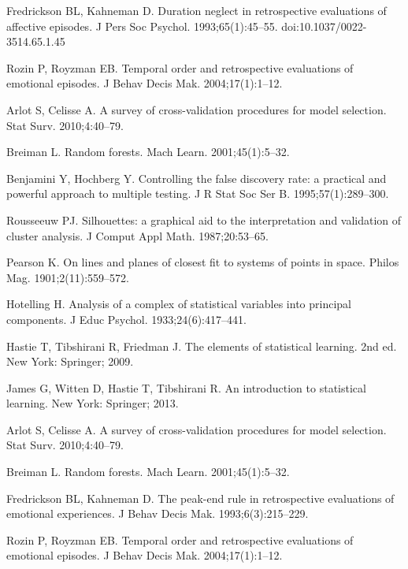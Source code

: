 \documentclass[10pt,letterpaper]{article}
\begin{document}
\begin{thebibliography}{22}
Fredrickson BL, Kahneman D.
\newblock Duration neglect in retrospective evaluations of affective episodes.
\newblock J Pers Soc Psychol. 1993;65(1):45--55.
\newblock doi:10.1037/0022-3514.65.1.45


Rozin P, Royzman EB.
\newblock Temporal order and retrospective evaluations of emotional episodes.
\newblock J Behav Decis Mak. 2004;17(1):1--12.

Arlot S, Celisse A.
\newblock A survey of cross-validation procedures for model selection.
\newblock Stat Surv. 2010;4:40--79.

Breiman L.
\newblock Random forests.
\newblock Mach Learn. 2001;45(1):5--32.

Benjamini Y, Hochberg Y.
\newblock Controlling the false discovery rate: a practical and powerful approach to multiple testing.
\newblock J R Stat Soc Ser B. 1995;57(1):289--300.

Rousseeuw PJ.
\newblock Silhouettes: a graphical aid to the interpretation and validation of cluster analysis.
\newblock J Comput Appl Math. 1987;20:53--65.

Pearson K.
\newblock On lines and planes of closest fit to systems of points in space.
\newblock Philos Mag. 1901;2(11):559--572.

Hotelling H.
\newblock Analysis of a complex of statistical variables into principal components.
\newblock J Educ Psychol. 1933;24(6):417--441.

Hastie T, Tibshirani R, Friedman J.
\newblock The elements of statistical learning. 2nd ed.
\newblock New York: Springer; 2009.

James G, Witten D, Hastie T, Tibshirani R.
\newblock An introduction to statistical learning.
\newblock New York: Springer; 2013.

Arlot S, Celisse A.
\newblock A survey of cross-validation procedures for model selection.
\newblock Stat Surv. 2010;4:40--79.

Breiman L.
\newblock Random forests.
\newblock Mach Learn. 2001;45(1):5--32.

Fredrickson BL, Kahneman D.
\newblock The peak-end rule in retrospective evaluations of emotional experiences.
\newblock J Behav Decis Mak. 1993;6(3):215--229.

Rozin P, Royzman EB.
\newblock Temporal order and retrospective evaluations of emotional episodes.
\newblock J Behav Decis Mak. 2004;17(1):1--12.

\end{thebibliography}
\end{document}
